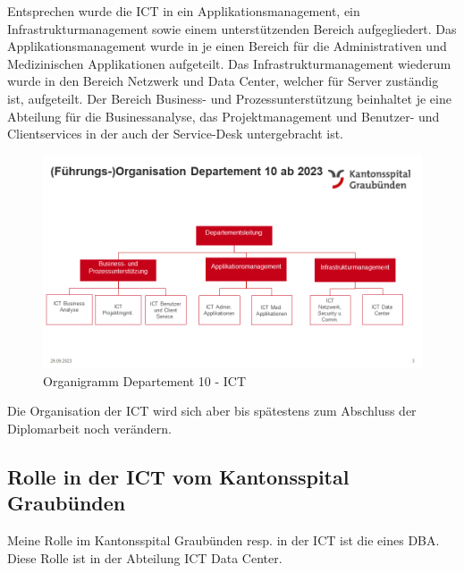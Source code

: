 \begin{flushleft}
    Entsprechen wurde die ICT in ein Applikationsmanagement, ein Infrastrukturmanagement sowie einem unterstützenden Bereich aufgegliedert.
    Das Applikationsmanagement wurde in je einen Bereich für die Administrativen und Medizinischen Applikationen aufgeteilt.
    Das Infrastrukturmanagement wiederum wurde in den Bereich Netzwerk und Data Center, welcher für Server zuständig ist, aufgeteilt.
    Der Bereich Business- und Prozessunterstützung beinhaltet je eine Abteilung für die Businessanalyse, das Projektmanagement und Benutzer- und Clientservices in der auch der Service-Desk untergebracht ist.
    \begin{figure}[H]
        \centering
        \includegraphics[width=1\linewidth]{source/introduction/initial_situation/Organigramm-D10}
        \caption{Organigramm Departement 10 - ICT}
        \label{fig:Organigramm_D10}
    \end{figure}
\end{flushleft}
\begin{flushleft}
    Die Organisation der ICT wird sich aber bis spätestens zum Abschluss der Diplomarbeit noch verändern.
\end{flushleft}
\begin{flushleft}
    \subsection{Rolle in der ICT vom Kantonsspital Graubünden}
    Meine Rolle im Kantonsspital Graubünden resp. in der ICT ist die eines DBA.
    Diese Rolle ist in der Abteilung ICT Data Center.
\end{flushleft}
